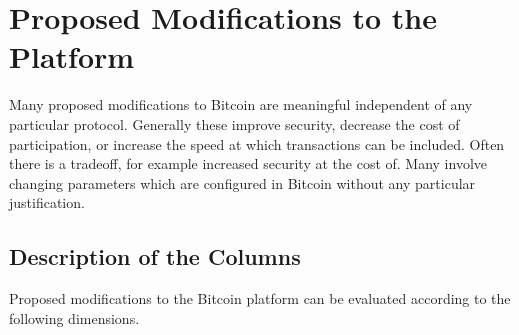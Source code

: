 \section{Proposed Modifications to the Platform}

Many proposed modifications to Bitcoin are meaningful independent of any particular protocol. Generally these improve security, decrease the cost of participation, or increase the speed at which transactions can be included. Often there is a tradeoff, for example increased security at the cost of. Many involve changing parameters which are configured in Bitcoin without any particular justification.


\subsection{Description of the Columns}

Proposed modifications to the Bitcoin platform can be evaluated according to the following dimensions.

